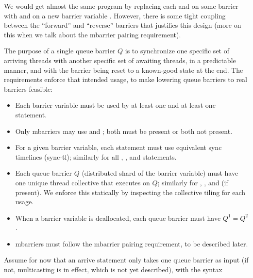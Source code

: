 \filbreak
We would get almost the same program by replacing each  and  on some barrier  with  and  on a new barrier variable .
However, there is some tight coupling between the ``forward'' and ``reverse'' barriers that justifies this design (more on this when we talk about the mbarrier pairing requirement).

\filbreak
{}

The purpose of a single queue barrier $Q$ is to synchronize one specific set of arriving threads with another specific set of awaiting threads, in a predictable manner, and with the barrier being reset to a known-good state at the end.
The requirements enforce that intended usage, to make lowering queue barriers to real barriers feasible:

\filbreak
\begin{itemize}
  \item Each barrier variable must be used by at least one  and at least one  statement.
  \filbreak
  \item Only mbarriers may use  and ; both must be present or both not present.
  \filbreak
  \item For a given barrier variable, each  statement must use equivalent sync timelines (sync-tl); similarly for all , , and  statements.
  \filbreak
  \item Each queue barrier $Q$ (distributed shard of the barrier variable) must have one unique thread collective that executes  on $Q$; similarly for , , and  (if present). We enforce this statically by inspecting the collective tiling for each usage.
  \filbreak
  \item When a barrier variable is deallocated, each queue barrier must have $Q^1 = Q^2$.
  \filbreak
  \item mbarriers must follow the mbarrier pairing requirement, to be described later.
\end{itemize}

\filbreak
{}

Assume for now that an arrive statement only takes one queue barrier as input (if not, multicasting is in effect, which is not yet described), with the syntax\\

